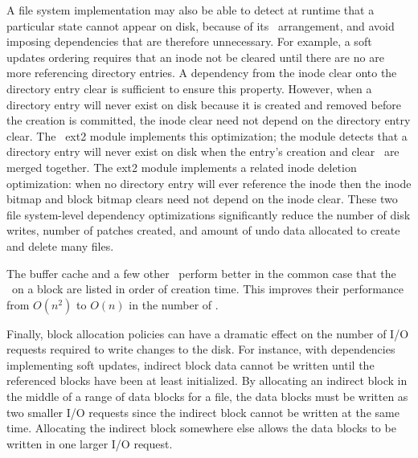 A file system implementation may also be able to detect at runtime
that a particular state cannot appear on disk, because of its \patch\
arrangement, and avoid imposing dependencies that are therefore
unnecessary.
%
For example, a soft updates ordering requires that an inode not be
cleared until there are no are more referencing directory entries.
%
A dependency from the inode clear onto the directory entry clear is
sufficient to ensure this property. However, when a directory entry
will never exist on disk because it is created and removed before the
creation is committed, the inode clear need not depend on the
directory entry clear.
%
The \Kudos\ ext2 module implements this optimization; the module
detects that a directory entry will never exist on disk when the
entry's creation and clear \patches\ are merged together.
%
The ext2 module implements a related inode deletion optimization: when
no directory entry will ever reference the inode then the inode bitmap
and block bitmap clears need not depend on the inode clear.
%
These two file system-level dependency optimizations significantly
reduce the number of disk writes, number of patches created, and
amount of undo data allocated to create and delete many files.



The buffer cache and a few other \modules\ perform better in the
common case that the \patches\ on a block are listed in order of creation
time.
%
This improves their performance from $O(n^2)$ to $O(n)$ in the number of
\patches.

Finally, block allocation policies can have a dramatic effect on the number of
I/O requests required to write changes to the disk. For instance, with
dependencies implementing soft updates, indirect block data cannot be written
until the referenced blocks have been at least initialized. By allocating an
indirect block in the middle of a range of data blocks for a file, the data
blocks must be written as two smaller I/O requests since the indirect block
cannot be written at the same time. Allocating the indirect block somewhere
else allows the data blocks to be written in one larger I/O request.


